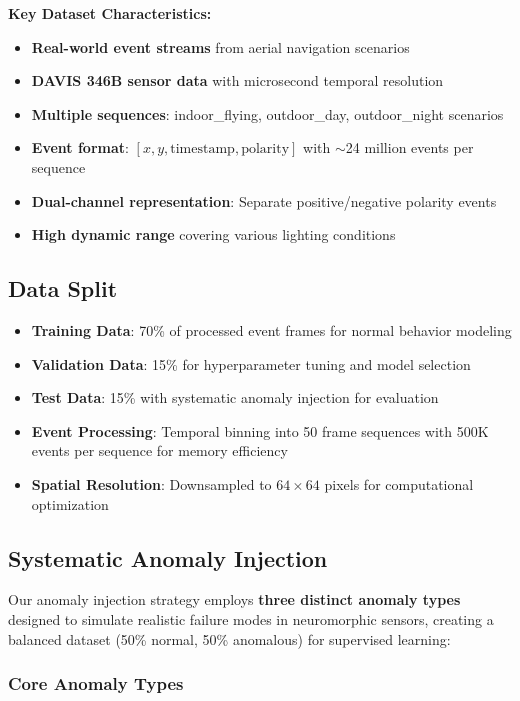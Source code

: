 \documentclass[12pt,a4paper]{article}
\begin{document}
\textbf{Key Dataset Characteristics:}
\begin{itemize}
    \item \textbf{Real-world event streams} from aerial navigation scenarios
    \item \textbf{DAVIS 346B sensor data} with microsecond temporal resolution
    \item \textbf{Multiple sequences}: indoor\_flying, outdoor\_day, outdoor\_night scenarios
    \item \textbf{Event format}: $[x, y, \text{timestamp}, \text{polarity}]$ with $\sim$24 million events per sequence
    \item \textbf{Dual-channel representation}: Separate positive/negative polarity events
    \item \textbf{High dynamic range} covering various lighting conditions
\end{itemize}

\subsection{Data Split}

\begin{itemize}
    \item \textbf{Training Data}: 70\% of processed event frames for normal behavior modeling
    \item \textbf{Validation Data}: 15\% for hyperparameter tuning and model selection
    \item \textbf{Test Data}: 15\% with systematic anomaly injection for evaluation
    \item \textbf{Event Processing}: Temporal binning into 50 frame sequences with 500K events per sequence for memory efficiency
    \item \textbf{Spatial Resolution}: Downsampled to $64 \times 64$ pixels for computational optimization
\end{itemize}

\subsection{Systematic Anomaly Injection}

Our anomaly injection strategy employs \textbf{three distinct anomaly types} designed to simulate realistic failure modes in neuromorphic sensors, creating a balanced dataset (50\% normal, 50\% anomalous) for supervised learning:

\subsubsection{Core Anomaly Types}
\end{document}
